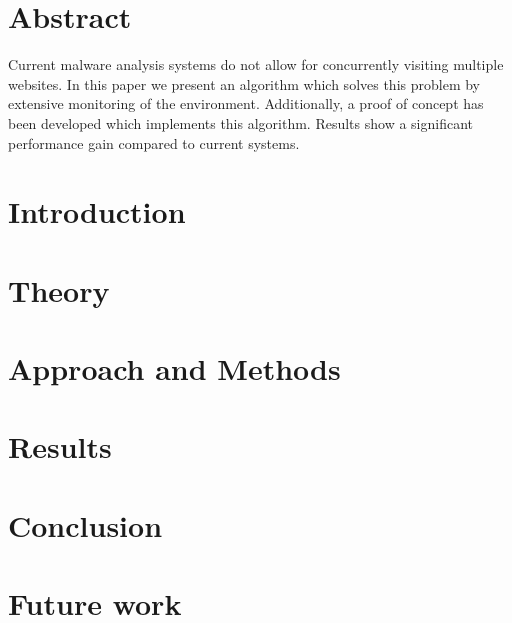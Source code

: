 \documentclass{scrartcl}
\begin{document}
\clearpage
\restoregeometry

\section*{Abstract}

Current malware analysis systems do not allow for concurrently visiting multiple websites. In this paper we present an algorithm which solves this problem by extensive monitoring of the environment. Additionally, a proof of concept has been developed which implements this algorithm. Results show a significant performance gain compared to current systems.

\clearpage

\tableofcontents

\clearpage


\section{Introduction}


\clearpage

\section{Theory}


\clearpage

\section{Approach and Methods}


\clearpage

\section{Results}


\clearpage

\section{Conclusion}


\clearpage

\section{Future work}

\end{document}
